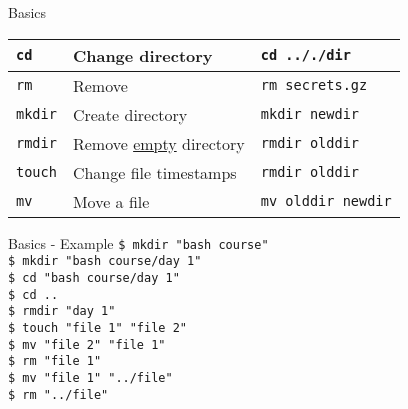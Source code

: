 \documentclass{beamer}
\let\tt\texttt
\let\ul\underline
\begin{document}
\begin{frame}{Basics}
        \begin{tabular}{l l l}
                \hline
                \tt{cd}           &
                Change directory  &
                \tt{cd .././dir}  \\
                \hline
                \tt{rm}           &
                Remove &
                \tt{rm secrets.gz}  \\
                \hline
                \tt{mkdir}           &
                Create directory &
                \tt{mkdir newdir}  \\
                \hline
                \tt{rmdir}           &
                Remove \ul{empty} directory &
                \tt{rmdir olddir}  \\
                \hline
                \tt{touch}               &
                Change file timestamps   &
                \tt{rmdir olddir}        \\
                \hline
                \tt{mv}                 &
                Move a file             &
                \tt{mv olddir newdir}   \\
                \hline
        \end{tabular}
\end{frame}
\begin{frame}{Basics - Example}
        \tt{\$ mkdir "bash course"}         \\
        \tt{\$ mkdir "bash course/day 1"}   \\
        \tt{\$ cd "bash course/day 1"}      \\
        \tt{\$ cd ..}                       \\
        \tt{\$ rmdir "day 1"}               \\
        \tt{\$ touch "file 1" "file 2"}     \\
        \tt{\$ mv "file 2" "file 1"}        \\
        \tt{\$ rm "file 1"}                 \\
        \tt{\$ mv "file 1" "../file"}       \\
        \tt{\$ rm "../file"}                \\
\end{frame}
\end{document}
